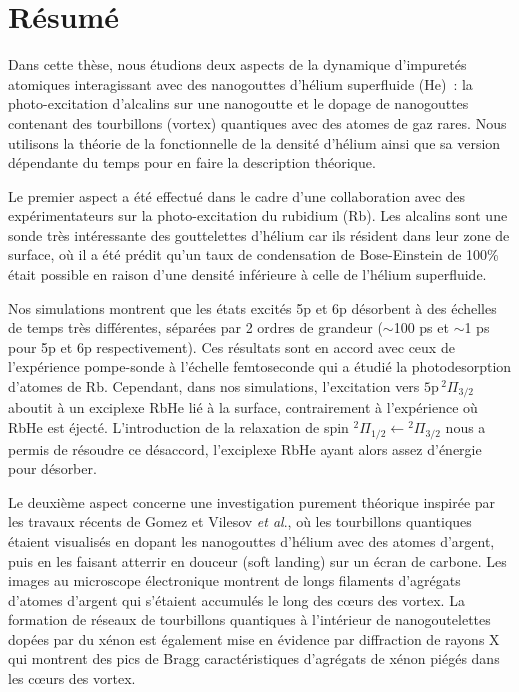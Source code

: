 \chapter{Résumé}
	Dans cette thèse, nous étudions deux aspects de la dynamique d'impuretés atomiques interagissant avec des nanogouttes d'hélium superfluide (He)~: la photo-excitation d'alcalins sur une nanogoutte et le dopage de nanogouttes contenant des tourbillons (vortex) quantiques avec des atomes de gaz rares. Nous utilisons la théorie de la fonctionnelle de la densité d'hélium ainsi que sa version dépendante du temps pour en faire la description théorique.

	Le premier aspect a été effectué dans le cadre d'une collaboration avec des expérimentateurs sur la photo-excitation du rubidium (Rb). Les alcalins sont une sonde très intéressante des gouttelettes d'hélium car ils résident dans leur zone de surface, où il a été prédit qu'un taux de condensation de Bose-Einstein de 100\% était possible en raison d'une densité inférieure à celle de l'hélium superfluide.

	Nos simulations montrent que les états excités 5p et 6p désorbent à des échelles de temps très différentes, séparées par 2 ordres de grandeur ($\sim$100 ps et $\sim$1 ps pour  5p et 6p respectivement). Ces résultats sont en accord avec ceux de l'expérience pompe-sonde à l'échelle femtoseconde qui a étudié la photodesorption d'atomes de Rb. Cependant, dans nos simulations, l'excitation vers $5\mathrm{p}\,^2\Pi_{3/2}$ aboutit à un exciplexe RbHe lié à la surface, contrairement à l'expérience où RbHe est éjecté. L'introduction de la relaxation de spin $^2\Pi_{1/2}\leftarrow{^ 2}\Pi_{3/2}$ nous a permis de résoudre ce désaccord, l'exciplexe RbHe ayant alors assez d'énergie pour désorber. 

	Le deuxième aspect concerne une investigation purement théorique inspirée par les travaux récents de Gomez et Vilesov \emph{et al}., où les tourbillons quantiques étaient visualisés en dopant les nanogouttes d'hélium avec des atomes d'argent, puis en les faisant atterrir en douceur (soft landing) sur un écran de carbone. Les images au microscope électronique montrent de longs filaments d'agrégats d'atomes d'argent qui s'étaient accumulés le long des c\oe urs des vortex. La formation de réseaux de tourbillons quantiques à l'intérieur de nanogoutelettes dopées par du xénon est également mise en évidence par diffraction de rayons X qui montrent des pics de Bragg caractéristiques d'agrégats de xénon piégés dans les c\oe urs des vortex.

